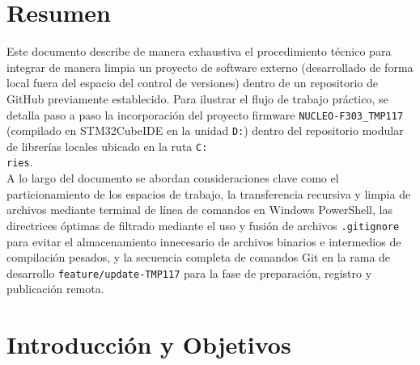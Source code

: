 \documentclass[
10pt, %
a4paper, %
oneside, %
headinclude,footinclude, %
BCOR5mm, %
]{scrartcl}
\begin{document}
\setcounter{tocdepth}{3} %

\section*{Resumen}
Este documento describe de manera exhaustiva el procedimiento técnico para integrar de manera limpia un proyecto de software externo (desarrollado de forma local fuera del espacio del control de versiones) dentro de un repositorio de GitHub previamente establecido. Para ilustrar el flujo de trabajo práctico, se detalla paso a paso la incorporación del proyecto firmware \texttt{NUCLEO-F303\_TMP117} (compilado en STM32CubeIDE en la unidad \texttt{D:}) dentro del repositorio modular de librerías locales ubicado en la ruta \texttt{C:\string\Users\string\casti\string\OneDrive\string\Documentos\string\GitHub\string\Libra\\ries\string\Libraries}.\\

A lo largo del documento se abordan consideraciones clave como el particionamiento de los espacios de trabajo, la transferencia recursiva y limpia de archivos mediante terminal de línea de comandos en Windows PowerShell, las directrices óptimas de filtrado mediante el uso y fusión de archivos \texttt{.gitignore} para evitar el almacenamiento innecesario de archivos binarios e intermedios de compilación pesados, y la secuencia completa de comandos Git en la rama de desarrollo \texttt{feature/update-TMP117} para la fase de preparación, registro y publicación remota.
\newpage %

\tableofcontents %

\newpage

\section{Introducción y Objetivos}
\end{document}
